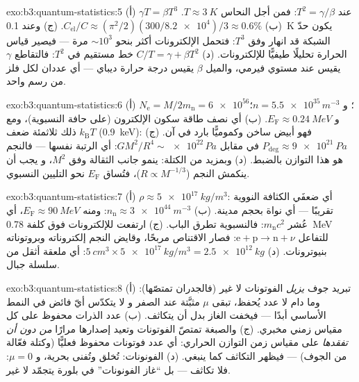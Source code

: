\begin{solution}{exo:b3:quantum-statistics:5}
(أ) $\gamma T = \beta T^3$ عند $T^2 = \gamma/\beta$: فمن أجل النحاس
$T \approx \qty{3}{K}$. (ب) $C_{\text{el}}/C \approx
(\pi^2/2)(300/\num{8.2e4})/3 \approx 0.6\%$. (ج) وعند \qty{0.1}{K}
يكون حدّ الشبكة قد انهار وفق $T^3$: فتحمل الإلكترونات
أكثر بنحو $\sim10^3$ مرة --- فيصير قياس الحرارة تحليلًا
طيفيًّا للإلكترونات. (د) $C/T = \gamma + \beta T^2$ خط مستقيم في
$T^2$: فالتقاطع $\gamma$ يقيس  عند
مستوي فيرمي، والميل $\beta$ يقيس درجة حرارة ديباي --- أي عددان
لكل فلز من رسم واحد.
\end{solution}

\begin{solution}{exo:b3:quantum-statistics:6}
(أ) $N_{\text{e}} = M/2m_{\text{n}} = \num{6e56}$؛ و $n =
\num{5.5e35}\,\unit{m^{-3}}$؛ و $E_{\text{F}} \approx
\qty{0.24}{MeV}$. (ب) أي نصف طاقة سكون الإلكترون (على حافة
النسبوية)، ومع ذلك ثلاثمئة ضعف $k_{\text{B}}T$
(\qty{0.9}{keV}): فهو أبيض ساخن وكموميًّا بارد في آن. (ج)
$P_{\text{deg}} \approx \qty{9e21}{Pa}$ في مقابل $GM^2/R^4 \sim
\num{e22}\,\unit{Pa}$: أي الرتبة نفسها --- فالنجم هو هذا
التوازن بالضبط. (د) وبمزيد من الكتلة: ينمو جانب الثقالة وفق $M^2$، و
يجب أن ينكمش النجم ($R \propto M^{-1/3}$)، فتُساق $E_{\text{F}}$
نحو التليين النسبوي.
\end{solution}

\begin{solution}{exo:b3:quantum-statistics:7}
(أ) $\rho \approx \qty{5e17}{kg/m^3}$: أي ضعفَي الكثافة
النووية تقريبًا --- أي نواة بحجم مدينة. (ب) $n_{\text{n}}
\approx \qty{3e44}{m^{-3}}$: ومنه $E_{\text{F}} \approx \qty{90}{MeV}$،
أي عُشر $m_{\text{n}}c^2$: فالنسبوية تطرق الباب. (ج)
ارتفعت  للإلكترونات فوق كلفة \qty{0.78}{MeV} للتفاعل
$\text{e} + \text{p} \to \text{n} + \nu$: فصار الاقتناص
مربحًا، وقايض النجم إلكتروناته وبروتوناته
بنيوترونات. (د) $\qty{5}{cm^3} \times \qty{5e17}{kg/m^3} =
\qty{2.5e12}{kg}$: أي ملعقة أثقل من سلسلة جبال.
\end{solution}

\begin{solution}{exo:b3:quantum-statistics:8}
(أ) تبريد جوف \emph{يزيل} الفوتونات لا غير (فالجدران تمتصّها):
وما دام لا عدد يُحفظ، تبقى $\mu$ مثبَّتة عند الصفر و
لا يتكدّس أيّ فائض في النمط الأساسي أبدًا --- فيخفت الغاز
بدل أن يتكاثف. (ب) عدد الذرات محفوظ على كل
مقياس زمني مخبري. (ج) والصبغة تمتصّ الفوتونات وتعيد إصدارها مرارًا
\emph{من دون أن تفقدها} على مقياس زمن التوازن
الحراري: أي عدد فوتونات محفوظ فعليًّا (وكتلة
فعّالة من الجوف) --- فيظهر التكاثف كما ينبغي.
(د) الفونونات: تُخلق وتُفنى بحرية، و $\mu = 0$: فلا
تكاثف --- بل ``غاز الفونونات'' في بلورة يتجمّد لا غير.
\end{solution}


